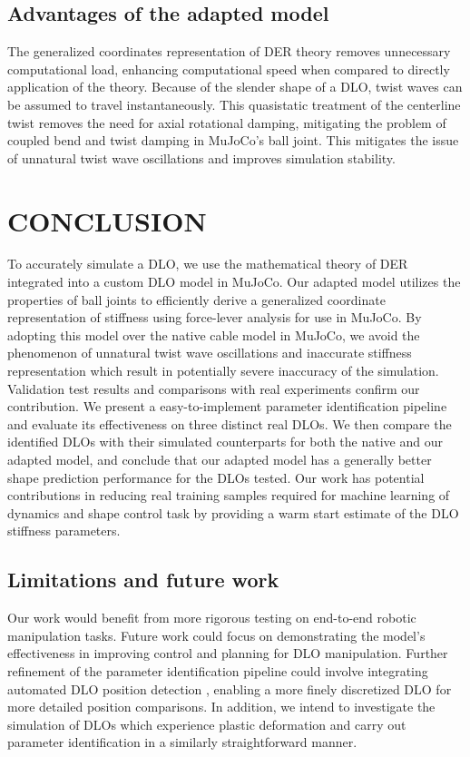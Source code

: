 \documentclass[letterpaper, 10 pt, conference]{ieeeconf}  %
\begin{document}
\subsection{Advantages of the adapted model}
The generalized coordinates representation of DER theory removes unnecessary computational load, enhancing computational speed when compared to directly application of the theory. Because of the slender shape of a DLO, twist waves can be assumed to travel instantaneously. This quasistatic treatment of the centerline twist removes the need for axial rotational damping, mitigating the problem of coupled bend and twist damping in MuJoCo's ball joint. This mitigates the issue of unnatural twist wave oscillations and improves simulation stability.


\section{CONCLUSION}
To accurately simulate a DLO, we use the mathematical theory of DER integrated into a custom DLO model in MuJoCo. Our adapted model utilizes the properties of ball joints to efficiently derive a generalized coordinate representation of stiffness using force-lever analysis for use in MuJoCo. By adopting this model over the native cable model in MuJoCo, we avoid the phenomenon of unnatural twist wave oscillations and inaccurate stiffness representation which result in potentially severe inaccuracy of the simulation. Validation test results and comparisons with real experiments confirm our contribution. We present a easy-to-implement parameter identification pipeline and evaluate its effectiveness on three distinct real DLOs. We then compare the identified DLOs with their simulated counterparts for both the native and our adapted model, and conclude that our adapted model has a generally better shape prediction performance for the DLOs tested. Our work has potential contributions in reducing real training samples required for machine learning of dynamics and shape control task by providing a warm start estimate of the DLO stiffness parameters. 

\subsection*{Limitations and future work}
Our work would benefit from more rigorous testing on end-to-end robotic manipulation tasks. Future work could focus on demonstrating the model's effectiveness in improving control and planning for DLO manipulation. Further refinement of the parameter identification pipeline could involve integrating automated DLO position detection \cite{zhaole2023robust}, enabling a more finely discretized DLO for more detailed position comparisons. In addition, we intend to investigate the simulation of DLOs which experience plastic deformation and carry out parameter identification in a similarly straightforward manner.
\end{document}

